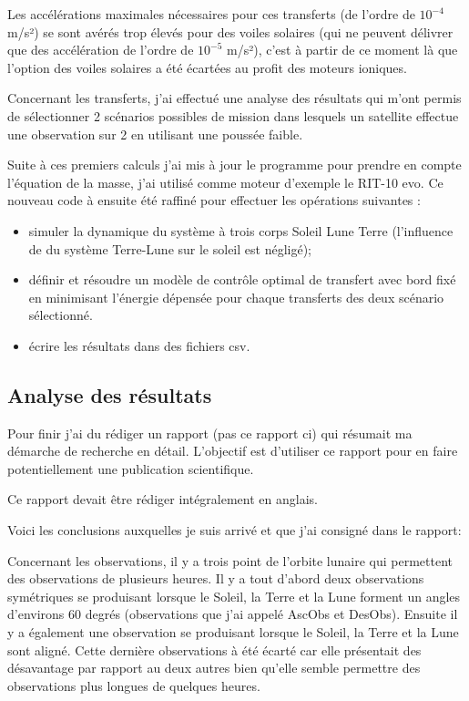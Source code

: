 \documentclass[11pt]{article} %
\begin{document}
		Les accélérations maximales nécessaires pour ces transferts (de l'ordre de $10^{-4}$ m/s²) se sont avérés trop élevés pour des voiles solaires (qui ne peuvent délivrer que des accélération de l'ordre de $10^{-5}$ m/s²), c'est à partir de ce moment là que l'option des voiles solaires a été écartées au profit des moteurs ioniques.	
		
		Concernant les transferts, j'ai effectué une analyse des résultats qui m'ont permis de sélectionner 2 scénarios possibles de mission dans lesquels un satellite effectue une observation sur 2 en utilisant une poussée faible.
		
		Suite à ces premiers calculs j'ai mis à jour le programme pour prendre en compte l'équation de la masse, j'ai utilisé comme moteur d'exemple le RIT-10 evo. Ce nouveau code à ensuite été raffiné pour effectuer les opérations suivantes : 
		
		\begin{itemize}
			\item simuler la dynamique du système à trois corps Soleil Lune Terre (l'influence de du système Terre-Lune sur le soleil est négligé);
			\item définir et résoudre un modèle de contrôle optimal de transfert avec bord fixé en minimisant l'énergie dépensée pour chaque transferts des deux scénario sélectionné.
			\item écrire les résultats dans des fichiers csv.
		\end{itemize}
		\subsection{Analyse des résultats}
		
		Pour finir j'ai du rédiger un rapport (pas ce rapport ci) qui résumait ma démarche de recherche en détail. L'objectif est d'utiliser ce rapport pour en faire potentiellement une publication scientifique.
		
		Ce rapport devait être rédiger intégralement en anglais. 
		
		Voici les conclusions auxquelles je suis arrivé et que j'ai consigné dans le rapport: 
		
		Concernant les observations, il y a trois point de l'orbite lunaire qui permettent des observations de plusieurs heures. Il y a tout d'abord deux observations symétriques se produisant lorsque le Soleil, la Terre et la Lune forment un angles d'environs 60 degrés (observations que j'ai appelé \gls{AscObs} et \gls{DesObs}). Ensuite il y a également une observation se produisant lorsque le Soleil, la Terre et la Lune sont aligné. Cette dernière observations à été écarté car elle présentait des désavantage par rapport au deux autres bien qu'elle semble permettre des observations plus longues de quelques heures.
		
\end{document}
